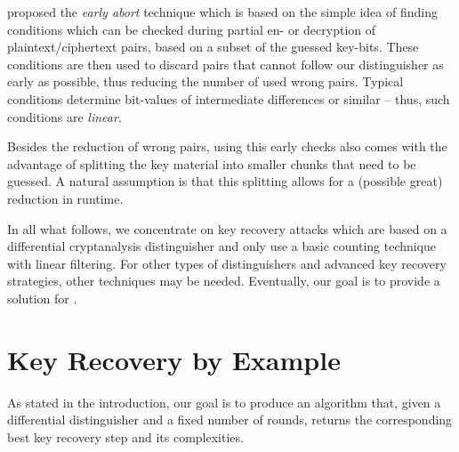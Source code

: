 \textcite{RSA:LKKD08} proposed the \emph{early abort} technique which is based on the simple idea of finding conditions which can be checked during partial en- or decryption of plaintext/ciphertext pairs, based on a subset of the guessed key-bits.
These conditions are then used to discard pairs that cannot follow our distinguisher as early as possible, thus reducing the number of used wrong pairs.
Typical conditions determine bit-values of intermediate differences or similar -- thus, such conditions are \emph{linear}.

Besides the reduction of wrong pairs, using this early checks also comes with the advantage of splitting the key material into smaller chunks that need to be guessed.
A natural assumption is that this splitting allows for a (possible great) reduction in runtime.

In all what follows, we concentrate on key recovery attacks which are based on a differential cryptanalysis distinguisher and only use a basic counting technique with linear filtering.
For other types of distinguishers and advanced key recovery strategies, other techniques may be needed.
Eventually, our goal is to provide a solution for .

\section{Key Recovery by Example}

As stated in the introduction, our goal is to produce an algorithm that, given a differential distinguisher and a fixed number of rounds, returns the corresponding best key recovery step and its complexities.


